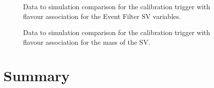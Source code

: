 \begin{figure}[H]
\caption{Data to simulation comparison for the calibration trigger with flavour association for the Event Filter SV variables.}
\label{fig:datamc_calib_flavour_sv_ef}
\end{figure}

\begin{figure}[H]
\caption{Data to simulation comparison for the calibration trigger with flavour association for the mass of the SV.}
\label{fig:datamc_calib_flavour_msv}
\end{figure}





\section{Summary}

